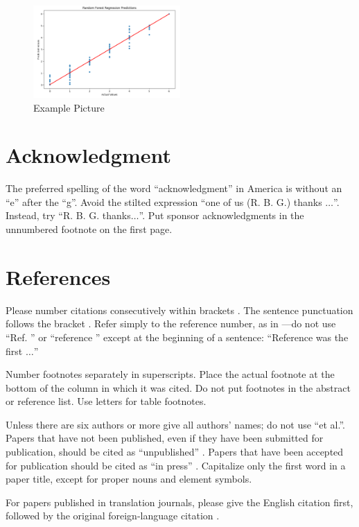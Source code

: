\documentclass[conference]{IEEEtran}
\begin{document}
\begin{figure}[h]
    \centering
    \includegraphics[width=0.5\textwidth]{lr.png}
    \caption{Example Picture}
    \label{fig:example}
\end{figure}


\section*{Acknowledgment}

The preferred spelling of the word ``acknowledgment'' in America is without 
an ``e'' after the ``g''. Avoid the stilted expression ``one of us (R. B. 
G.) thanks $\ldots$''. Instead, try ``R. B. G. thanks$\ldots$''. Put sponsor 
acknowledgments in the unnumbered footnote on the first page.

\section*{References}

Please number citations consecutively within brackets \cite{b1}. The 
sentence punctuation follows the bracket \cite{b2}. Refer simply to the reference 
number, as in \cite{b3}---do not use ``Ref. \cite{b3}'' or ``reference \cite{b3}'' except at 
the beginning of a sentence: ``Reference \cite{b3} was the first $\ldots$''

Number footnotes separately in superscripts. Place the actual footnote at 
the bottom of the column in which it was cited. Do not put footnotes in the 
abstract or reference list. Use letters for table footnotes.

Unless there are six authors or more give all authors' names; do not use 
``et al.''. Papers that have not been published, even if they have been 
submitted for publication, should be cited as ``unpublished'' \cite{b4}. Papers 
that have been accepted for publication should be cited as ``in press'' \cite{b5}. 
Capitalize only the first word in a paper title, except for proper nouns and 
element symbols.

For papers published in translation journals, please give the English 
citation first, followed by the original foreign-language citation \cite{b6}.
\end{document}
